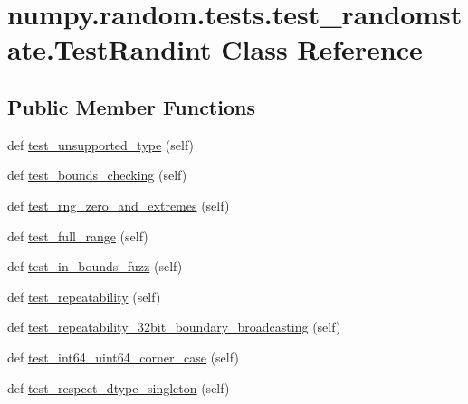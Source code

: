 \hypertarget{classnumpy_1_1random_1_1tests_1_1test__randomstate_1_1TestRandint}{}\section{numpy.\+random.\+tests.\+test\+\_\+randomstate.\+Test\+Randint Class Reference}
\label{classnumpy_1_1random_1_1tests_1_1test__randomstate_1_1TestRandint}
\subsection*{Public Member Functions}
\begin{DoxyCompactItemize}
\item 
def \hyperlink{classnumpy_1_1random_1_1tests_1_1test__randomstate_1_1TestRandint_a5da2a103368f8d4ebe6495ea75a2f821}{test\+\_\+unsupported\+\_\+type} (self)
\item 
def \hyperlink{classnumpy_1_1random_1_1tests_1_1test__randomstate_1_1TestRandint_aa535276dc6c14f69fe3d3ef071e2fe64}{test\+\_\+bounds\+\_\+checking} (self)
\item 
def \hyperlink{classnumpy_1_1random_1_1tests_1_1test__randomstate_1_1TestRandint_a0868819a20b804d8810ef9ed3e3d674f}{test\+\_\+rng\+\_\+zero\+\_\+and\+\_\+extremes} (self)
\item 
def \hyperlink{classnumpy_1_1random_1_1tests_1_1test__randomstate_1_1TestRandint_a80a808a12053c64965a55fa51a332c29}{test\+\_\+full\+\_\+range} (self)
\item 
def \hyperlink{classnumpy_1_1random_1_1tests_1_1test__randomstate_1_1TestRandint_a134c2bbf9a6f820fc4ad87de61e05336}{test\+\_\+in\+\_\+bounds\+\_\+fuzz} (self)
\item 
def \hyperlink{classnumpy_1_1random_1_1tests_1_1test__randomstate_1_1TestRandint_a624e3b1edfdc1fe8b1b040017dc7bc9c}{test\+\_\+repeatability} (self)
\item 
def \hyperlink{classnumpy_1_1random_1_1tests_1_1test__randomstate_1_1TestRandint_af184115c4acdce767dcebd45346831a5}{test\+\_\+repeatability\+\_\+32bit\+\_\+boundary\+\_\+broadcasting} (self)
\item 
def \hyperlink{classnumpy_1_1random_1_1tests_1_1test__randomstate_1_1TestRandint_a9ee8afb4d624970b467cfea64f9cf19c}{test\+\_\+int64\+\_\+uint64\+\_\+corner\+\_\+case} (self)
\item 
def \hyperlink{classnumpy_1_1random_1_1tests_1_1test__randomstate_1_1TestRandint_adc35c465d7df62f36185b36e4718dbcf}{test\+\_\+respect\+\_\+dtype\+\_\+singleton} (self)
\end{DoxyCompactItemize}
